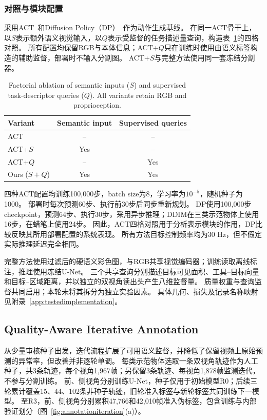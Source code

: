 \subsubsection{对照与模块配置}
采用ACT~\cite{zhao2023act}和Diffusion Policy（DP）~\cite{chi2023diffusion}作为动作生成基线。
在同一ACT骨干上，以$S$表示额外语义视觉输入，以$Q$表示受监督的任务描述量查询，构造表~\ref{tab:ablationdesign}的四格对照。
所有配置均保留RGB与本体信息；ACT+$Q$只在训练时使用由语义标签构造的辅助监督，部署时不输入分割图。
ACT+$S$与完整方法使用同一套冻结分割器。

\begin{table}[t]
\centering
\caption{Factorial ablation of semantic inputs ($S$) and supervised task-descriptor queries ($Q$). All variants retain RGB and proprioception.}
\label{tab:ablationdesign}
\small
\begin{tabular}{lcc}
\toprule
Variant & Semantic input & Supervised queries\\
\midrule
ACT & -- & --\\
ACT+$S$ & Yes & --\\
ACT+$Q$ & -- & Yes\\
Ours ($S+Q$) & Yes & Yes\\
\bottomrule
\end{tabular}
\end{table}

四种ACT配置均训练100,000步，batch size为8，学习率为$10^{-5}$，随机种子为1000。
部署时每次预测60步、执行前30步后同步重新规划。
DP使用100,000步checkpoint，预测64步、执行30步，采用异步推理；DDIM在三类示范物体上使用16步，在蜡笔上使用24步。
因此，ACT四格对照用于分析表示模块的作用，DP比较反映其所用部署配置的系统表现。
所有方法目标控制频率均为30 Hz，但不假定实际推理延迟完全相同。

完整方法使用过滤后的硬语义彩色图，与RGB共享视觉编码器；训练读取离线标注，推理使用冻结U-Net。
三个共享查询分别描述目标可见面积、工具--目标向量和目标--区域距离，并以独立的双视角读出头产生八维监督量。
质量权重与查询监督共同启用；本轮未将其拆分为独立实验因素。
具体几何、损失及记录名称映射见附录~\ref{app:testedimplementation}。

\subsection{Quality-Aware Iterative Annotation}
\label{sec:annotationresults}
从少量审核种子出发，迭代流程扩展了可用语义监督，并降低了保留视频上原始预测的异常率，但改善并非逐轮单调。
每类示范物体选取一条双视角轨迹作为人工种子，共3条轨迹，每个视角1,967帧；另保留3条轨迹、每视角1,878帧监测迭代，不参与分割训练。
前、侧视角分别训练U-Net，种子仅用于初始模型R0；后续三轮累计覆盖15、44、102条非种子轨迹，旧轮准入标签与新轮标签共同训练下一模型。
至R3，前、侧视角分别累积47,766和42,010帧准入伪标签，包含训练与内部验证划分（图~\ref{fig:annotationiteration}(a)）。

